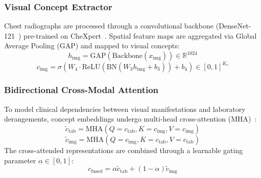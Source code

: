 \documentclass[10pt,journal,compsoc,twocolumn]{IEEEtran}
\begin{document}
\subsubsection{Visual Concept Extractor}
Chest radiographs are processed through a convolutional backbone (DenseNet-121~\cite{huang2017densely}) pre-trained on CheXpert~\cite{irvin2019chexpert}. Spatial feature maps are aggregated via Global Average Pooling (GAP) and mapped to visual concepts:
\begin{equation}
    h_{\text{img}} = \text{GAP}\left(\text{Backbone}(x_{\text{img}})\right) \in \mathbb{R}^{1024}
\end{equation}
\begin{equation}
    c_{\text{img}} = \sigma\left(W_4 \cdot \text{ReLU}\left(\text{BN}\left(W_3 h_{\text{img}} + b_3\right)\right) + b_4\right) \in [0, 1]^{K_v}
\end{equation}

\subsubsection{Bidirectional Cross-Modal Attention}
To model clinical dependencies between visual manifestations and laboratory derangements, concept embeddings undergo multi-head cross-attention (MHA)~\cite{vaswani2017attention}:
\begin{equation}
    \tilde{c}_{\text{tab}} = \text{MHA}\left(Q = c_{\text{tab}}, K = c_{\text{img}}, V = c_{\text{img}}\right)
\end{equation}
\begin{equation}
    \tilde{c}_{\text{img}} = \text{MHA}\left(Q = c_{\text{img}}, K = c_{\text{tab}}, V = c_{\text{tab}}\right)
\end{equation}
The cross-attended representations are combined through a learnable gating parameter $\alpha \in [0, 1]$:
\begin{equation}
    c_{\text{fused}} = \alpha \tilde{c}_{\text{tab}} + (1 - \alpha) \tilde{c}_{\text{img}}
\end{equation}
\end{document}
